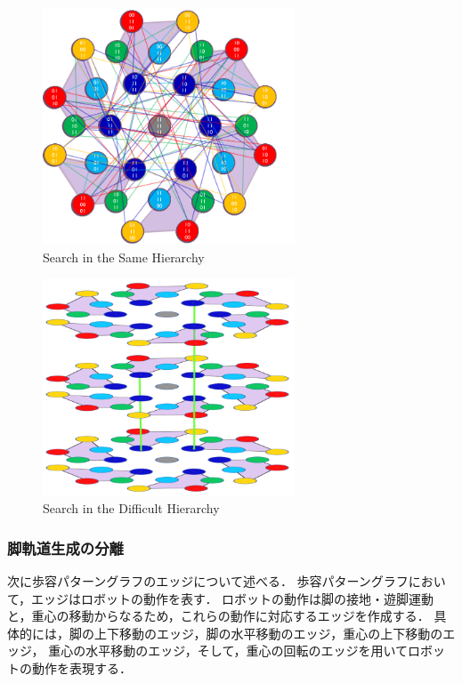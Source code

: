 \begin{figure}[htbp]
  \begin{center}
    \includegraphics[width=75mm, clip]{figure/chapter2/hierarchy2.png}
    \caption{Search in the Same Hierarchy}
    \label{fig:hierarchy2} %
  \end{center}
\end{figure}

\begin{figure}[htbp]
  \begin{center}
    \includegraphics[width=75mm, clip]{figure/chapter2/hierarchy.png}
    \caption{Search in the Difficult Hierarchy}
    \label{fig:hierarchy} %
  \end{center}
\end{figure}

\subsubsection{脚軌道生成の分離}
次に歩容パターングラフのエッジについて述べる．
歩容パターングラフにおいて，エッジはロボットの動作を表す．
ロボットの動作は脚の接地・遊脚運動と，重心の移動からなるため，これらの動作に対応するエッジを作成する．
具体的には，脚の上下移動のエッジ，脚の水平移動のエッジ，重心の上下移動のエッジ，
重心の水平移動のエッジ，そして，重心の回転のエッジを用いてロボットの動作を表現する．


